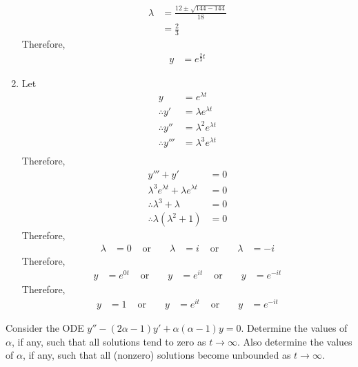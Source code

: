 \documentclass[fleqn, a4paper, 11pt, oneside]{amsart}
\theoremstyle{definition}
\theoremstyle{theorem}
\begin{document}
\begin{solution}
\begin{enumerate}[leftmargin = *]
			\begin{align*}
				\lambda & = \frac{12 \pm \sqrt{144 - 144}}{18} \\
                                        & = \frac{2}{3}
			\end{align*}
			Therefore,
			\begin{align*}
				y & = e^{\frac{2}{3} t}
			\end{align*}
		\item
			Let
			\begin{align*}
				y               & = e^{\lambda t}           \\
				\therefore y'   & = \lambda e^{\lambda t}   \\
				\therefore y''  & = \lambda^2 e^{\lambda t} \\
				\therefore y''' & = \lambda^3 e^{\lambda t} \\
			\end{align*}
			Therefore,
			\begin{align*}
				y''' + y'                                       & = 0 \\
				\lambda^3 e^{\lambda t} + \lambda e^{\lambda t} & = 0 \\
				\therefore \lambda^3 + \lambda                  & = 0 \\
				\therefore \lambda (\lambda^2 + 1)              & = 0
			\end{align*}
			Therefore,
			\begin{align*}
				\lambda & = 0 & \text{ or } &  & \lambda & = i & \text{ or } &  & \lambda & = -i
			\end{align*}
			Therefore,
			\begin{align*}
				y & = e^{0 t} & \text{ or } &  & y & = e^{i t} & \text{ or } &  & y & = e^{-i t}
			\end{align*}
			Therefore,
			\begin{align*}
				y & = 1 & \text{ or } &  & y & = e^{i t} & \text{ or } &  & y & = e^{-i t}
			\end{align*}
	\end{enumerate}
\end{solution}

\begin{question}
	Consider the ODE $y'' - (2 \alpha - 1) y' + \alpha (\alpha - 1) y = 0$.
	Determine the values of $\alpha$, if any, such that all solutions tend to zero as $t \to \infty$.
	Also determine the values of $\alpha$, if any, such that all (nonzero) solutions become unbounded as $t \to \infty$.
\end{question}
\end{document}
